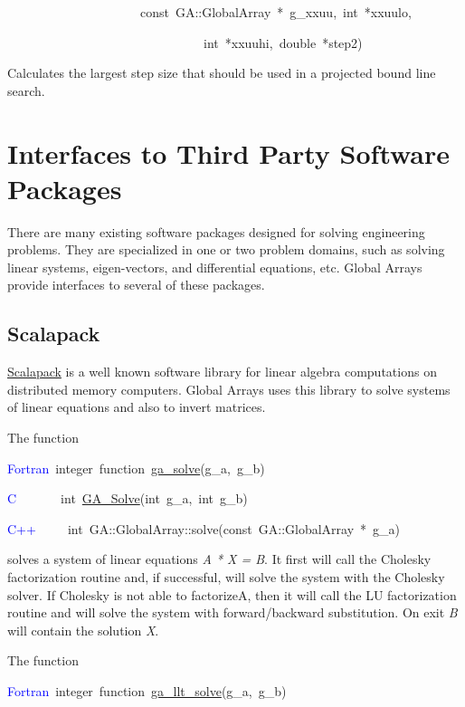 ~~~~~~~~~~~~~~~~~~~~~const~GA::GlobalArray~{*}~g\_xxuu,~int~{*}xxuulo,~

~~~~~~~~~~~~~~~~~~~~~~~~~~~~~~~int~{*}xxuuhi,~double~{*}step2)

Calculates the largest step size that should be used in a projected
bound line search. 


\section{Interfaces to Third Party Software Packages }

There are many existing software packages designed for solving engineering
problems. They are specialized in one or two problem domains, such
as solving linear systems, eigen-vectors, and differential equations,
etc. Global Arrays provide interfaces to several of these packages. 


\subsection{Scalapack }

\href{http://www.netlib.org/scalapack/index.html}{Scalapack} is a
well known software library for linear algebra computations on distributed
memory computers. Global Arrays uses this library to solve systems
of linear equations and also to invert matrices.

The function

\textcolor{blue}{Fortran}~integer~function~\href{https://hpc.pnl.gov/globalarrays/api/f_op_api.html\#ga_solve}{ga\_{}solve}(g\_a,~g\_b)

\textcolor{blue}{C}~~~~~~~int~\href{https://hpc.pnl.gov/globalarrays/api/c_op_api.html\#ga_solve}{GA\_{}Solve}(int~g\_a,~int~g\_b)~

\textcolor{blue}{C++}~~~~~int~GA::GlobalArray::solve(const~GA::GlobalArray~{*}~g\_a)

solves a system of linear equations \emph{A {*} X = B}. It first will
call the Cholesky factorization routine and, if successful, will solve
the system with the Cholesky solver. If Cholesky is not able to factorizeA,
then it will call the LU factorization routine and will solve the
system with forward/backward substitution. On exit \emph{B} will contain
the solution \emph{X}.

The function

\textcolor{blue}{Fortran}~integer~function~\href{https://hpc.pnl.gov/globalarrays/api/f_op_api.html\#ga_llt_solve}{ga\_{}llt\_{}solve}(g\_a,~g\_b)

